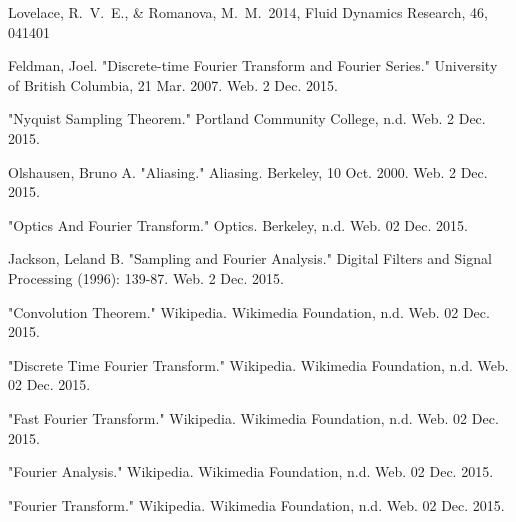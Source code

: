 \documentclass{article}
\begin{document}
\begin{thebibliography}{9}

	
	 Lovelace, R.~V.~E., \& Romanova, M.~M.\ 2014, Fluid Dynamics Research, 46, 041401 
	
	Feldman, Joel. "Discrete-time Fourier Transform and Fourier Series." University of British Columbia, 21 Mar. 2007. Web. 2 Dec. 2015.

	"Nyquist Sampling Theorem." Portland Community College, n.d. Web. 2 Dec. 2015.

	Olshausen, Bruno A. "Aliasing." Aliasing. Berkeley, 10 Oct. 2000. Web. 2 Dec. 2015.

	"Optics And Fourier Transform." Optics. Berkeley, n.d. Web. 02 Dec. 2015.
	
	Jackson, Leland B. "Sampling and Fourier Analysis." Digital Filters and Signal Processing (1996): 139-87. Web. 2 Dec. 2015.
	
	"Convolution Theorem." Wikipedia. Wikimedia Foundation, n.d. Web. 02 Dec. 2015.
	
	"Discrete Time Fourier Transform." Wikipedia. Wikimedia Foundation, n.d. Web. 02 Dec. 2015.
	
	"Fast Fourier Transform." Wikipedia. Wikimedia Foundation, n.d. Web. 02 Dec. 2015.
	
	"Fourier Analysis." Wikipedia. Wikimedia Foundation, n.d. Web. 02 Dec. 2015.
	
	"Fourier Transform." Wikipedia. Wikimedia Foundation, n.d. Web. 02 Dec. 2015.
\end{thebibliography}
\end{document}

